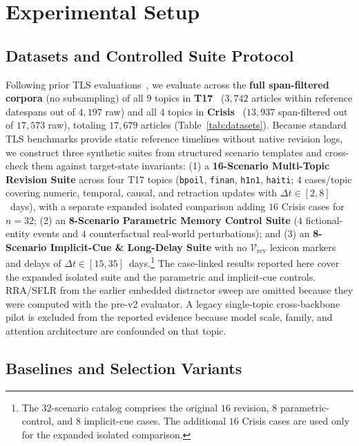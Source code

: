 \documentclass[journal]{IEEEtran}
\begin{document}
\section{Experimental Setup}
\label{sec:experiments}

\subsection{Datasets and Controlled Suite Protocol}
\label{subsec:datasets}

Following prior TLS evaluations~\cite{hu2024moments, wu2025unfolding}, we evaluate across the \textbf{full span-filtered corpora} (no subsampling) of all $9$ topics in \textbf{T17}~\cite{tran2013leveraging} ($3{,}742$ articles within reference datespans out of $4{,}197$ raw) and all $4$ topics in \textbf{Crisis}~\cite{tran2015timeline} ($13{,}937$ span-filtered out of $17{,}573$ raw), totaling $17{,}679$ articles (Table~\ref{tab:datasets}). Because standard TLS benchmarks provide static reference timelines without native revision logs, we construct three synthetic suites from structured scenario templates and cross-check them against target-state invariants: (1) a \textbf{16-Scenario Multi-Topic Revision Suite} across four T17 topics (\texttt{bpoil}, \texttt{finan}, \texttt{h1n1}, \texttt{haiti}; $4$ cases/topic covering numeric, temporal, causal, and retraction updates with $\Delta t \in [2, 8]$~days), with a separate expanded isolated comparison adding $16$ Crisis cases for $n=32$; (2) an \textbf{8-Scenario Parametric Memory Control Suite} ($4$ fictional-entity events and $4$ counterfactual real-world perturbations); and (3) an \textbf{8-Scenario Implicit-Cue \& Long-Delay Suite} with no $\mathcal{V}_{\text{rev}}$ lexicon markers and delays of $\Delta t \in [15, 35]$~days.\footnote{The $32$-scenario catalog comprises the original $16$ revision, $8$ parametric-control, and $8$ implicit-cue cases. The additional $16$ Crisis cases are used only for the expanded isolated comparison.} The case-linked results reported here cover the expanded isolated suite and the parametric and implicit-cue controls. RRA/SFLR from the earlier embedded distractor sweep are omitted because they were computed with the pre-v2 evaluator. A legacy single-topic cross-backbone pilot is excluded from the reported evidence because model scale, family, and attention architecture are confounded on that topic.

\subsection{Baselines and Selection Variants}
\label{subsec:baselines}
\end{document}
